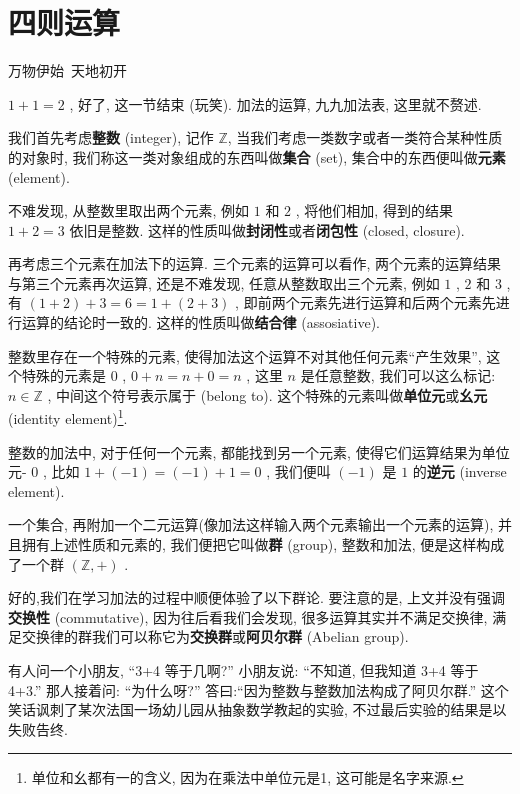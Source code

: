 \section{四则运算}\label{001}

\begin{flushright}{\kaishu 万物伊始\ 天地初开}\end{flushright}

\begin{tcolorbox}[size=fbox, breakable, enhanced jigsaw, title={加法 (addition)}]

$1+1=2$ , 好了, 这一节结束 (玩笑). 加法的运算, 九九加法表,
这里就不赘述.

我们首先考虑\textbf{整数} (integer), 记作 $\mathbb{Z}$,
当我们考虑一类数字或者一类符合某种性质的对象时,
我们称这一类对象组成的东西叫做\textbf{集合} (set),
集合中的东西便叫做\textbf{元素} (element).

\begin{itemize}
{\item
  不难发现, 从整数里取出两个元素, 例如 $1$ 和 $2$ , 将他们相加,
  得到的结果 $1+2=3$ 依旧是整数.
  这样的性质叫做\textbf{封闭性}或者\textbf{闭包性} (closed, closure).}
{\item
  再考虑三个元素在加法下的运算. 三个元素的运算可以看作,
  两个元素的运算结果与第三个元素再次运算, 还是不难发现,
  任意从整数取出三个元素, 例如 $1$ , $2$ 和 $3$ , 有
  $(1+2)+3=6=1+(2+3)$ ,
  即前两个元素先进行运算和后两个元素先进行运算的结论时一致的.
  这样的性质叫做\textbf{结合律} (assosiative).}
{\item
  整数里存在一个特殊的元素,
  使得加法这个运算不对其他任何元素``产生效果'', 这个特殊的元素是 $0$ ,
  $0+n=n+0=n$ , 这里 $n$ 是任意整数, 我们可以这么标记:
  $n\in\mathbb{Z}$ , 中间这个符号表示属于 (belong to).
  这个特殊的元素叫做\textbf{单位元}或\textbf{幺元} (identity
  element)\footnote{单位和幺都有一的含义, 因为在乘法中单位元是1,
    这可能是名字来源.}.}
{\item
  整数的加法中, 对于任何一个元素, 都能找到另一个元素,
  使得它们运算结果为单位元- $0$ , 比如 $1+(−1)=(−1)+1=0$ , 我们便叫
  $(−1)$ 是 $1$ 的\textbf{逆元} (inverse element).}
\end{itemize}

一个集合, 再附加一个二元运算(像加法这样输入两个元素输出一个元素的运算),
并且拥有上述性质和元素的, 我们便把它叫做\textbf{群} (group), 整数和加法,
便是这样构成了一个群 $(\mathbb{Z},+)$ .

好的,我们在学习加法的过程中顺便体验了以下群论. 要注意的是,
上文并没有强调\textbf{交换性} (commutative), 因为往后看我们会发现,
很多运算其实并不满足交换律,
满足交换律的群我们可以称它为\textbf{交换群}或\textbf{阿贝尔群} (Abelian
group).

\begin{newquote}
有人问一个小朋友, ``3+4 等于几啊?'' 小朋友说: ``不知道, 但我知道 3+4
等于 4+3.'' 那人接着问: ``为什么呀?''
答曰:``因为整数与整数加法构成了阿贝尔群.''
这个笑话讽刺了某次法国一场幼儿园从抽象数学教起的实验,
不过最后实验的结果是以失败告终.
\end{newquote}

\end{tcolorbox}

